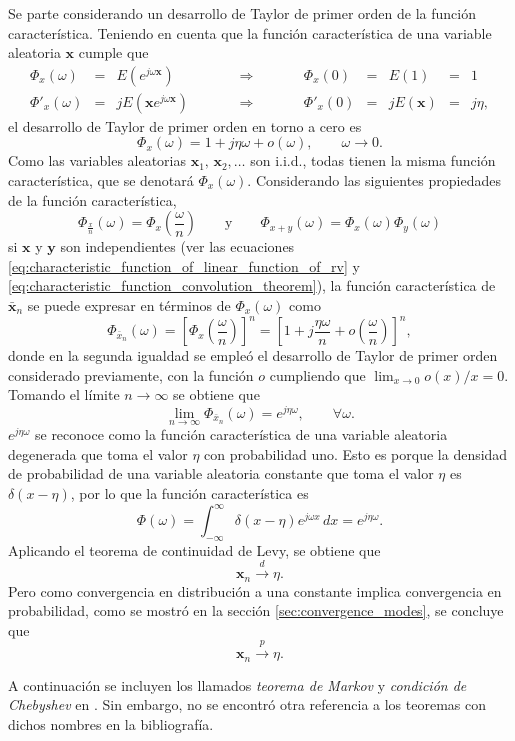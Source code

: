 \documentclass[a4paper]{report}
\newcommand{\x}{\mathbf{x}}
\newcommand{\y}{\mathbf{y}}
\begin{document}
Se parte considerando un desarrollo de Taylor de primer orden de la función característica.
Teniendo en cuenta que la función característica de una variable aleatoria \(\x\) cumple que
\[
 \begin{array}{ccccccccccc}
  \Phi_x(\omega)&=&E(e^{j\omega\x})&\qquad&\Rightarrow&\qquad&\Phi_x(0)&=&E(1)&=&1\\
  \Phi'_x(\omega)&=&jE(\x e^{j\omega\x})&\qquad&\Rightarrow&\qquad&\Phi'_x(0)&=&jE(\x)&=&j\eta,
 \end{array}
\]
el desarrollo de Taylor de primer orden en torno a cero es
\[
 \Phi_x(\omega)=1+j\eta\omega+o(\omega),\qquad\omega\to0.
\]
Como las variables aleatorias \(\x_1,\,\x_2,\dots\) son i.i.d., todas tienen la misma función característica, que se denotará \(\Phi_x(\omega)\).
Considerando las siguientes propiedades de la función característica,
\[
 \Phi_\frac{x}{n}(\omega)=\Phi_x\left(\frac{\omega}{n}\right)
 \qquad\textrm{y}\qquad
 \Phi_{x+y}(\omega)=\Phi_x(\omega)\Phi_y(\omega)
\]
si \(\x\) y \(\y\) son independientes (ver las ecuaciones \ref{eq:characteristic_function_of_linear_function_of_rv} y \ref{eq:characteristic_function_convolution_theorem}), la función característica de \(\bar{\x}_n\) se puede expresar en términos de \(\Phi_x(\omega)\) como
\[
 \Phi_{\bar{x}_n}(\omega)=\left[\Phi_x\left(\frac{\omega}{n}\right)\right]^n=\left[1+j\frac{\eta\omega}{n}+o\left(\frac{\omega}{n}\right)\right]^n,
\]
donde en la segunda igualdad se empleó el desarrollo de Taylor de primer orden considerado previamente, con la función \(o\) cumpliendo que \(\lim_{x\to0}o(x)/x=0\). Tomando el límite \(n\to\infty\) se obtiene que
\[
 \lim_{n\to\infty}\Phi_{\bar{x}_n}(\omega)=e^{j\eta\omega},\qquad\forall\omega.
\]
\(e^{j\eta\omega}\) se reconoce como la función característica de una variable aleatoria degenerada que toma el valor \(\eta\) con probabilidad uno. Esto es porque la densidad de probabilidad de una variable aleatoria constante que toma el valor \(\eta\) es \(\delta(x-\eta)\), por lo que la función característica es
\[
 \Phi(\omega)=\int_{-\infty}^\infty\delta(x-\eta) e^{j\omega x}\,dx=e^{j\eta\omega}.
\]
Aplicando el teorema de continuidad de Levy, se obtiene que 
\[
 \x_n\overset{d}{\to}\eta.
\]
Pero como convergencia en distribución a una constante implica convergencia en probabilidad, como se mostró en la sección \ref{sec:convergence_modes}, se concluye que 
\[
 \x_n\overset{p}{\to}\eta.
\]

A continuación se incluyen los llamados \emph{teorema de Markov} y \emph{condición de Chebyshev} en \cite{papoulis2002probability}. Sin embargo, no se encontró otra referencia a los teoremas con dichos nombres en la bibliografía.
\end{document}
